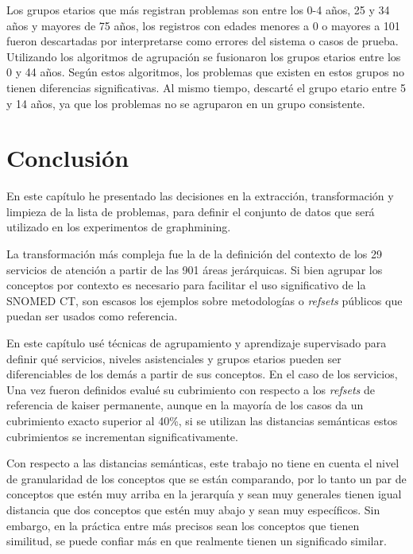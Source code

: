 Los grupos etarios que más registran problemas son entre los 0-4 años, 25 y 34 años y mayores de 75 años, los registros con edades menores a 0 o mayores a 101 fueron descartadas por interpretarse como errores del sistema o casos de prueba. Utilizando los algoritmos de agrupación se fusionaron los grupos etarios entre los 0 y 44 años. Según estos algoritmos, los problemas que existen en estos grupos no tienen diferencias significativas. Al mismo tiempo, descarté el grupo etario entre 5 y 14 años, ya que los problemas no se agruparon en un grupo consistente.

\section{Conclusión}
En este capítulo he presentado las decisiones en la extracción, transformación y limpieza de la lista de problemas, para definir el conjunto de datos que será utilizado en los experimentos de graphmining. 

La transformación más compleja fue la de la definición del contexto de los 29 servicios de atención a partir de las 901 áreas jerárquicas. Si bien agrupar los conceptos por contexto es necesario para facilitar el uso significativo de la SNOMED CT, son escasos los ejemplos sobre metodologías o \textit{refsets} públicos que puedan ser usados como referencia.

En este capítulo usé técnicas de agrupamiento y aprendizaje supervisado para definir qué servicios, niveles asistenciales y grupos etarios pueden ser diferenciables de los demás a partir de sus conceptos. En el caso de los servicios, Una vez fueron definidos evalué su cubrimiento con respecto a los \textit{refsets} de referencia de kaiser permanente, aunque en la mayoría de los casos da un cubrimiento exacto superior al 40\%, si se utilizan las distancias semánticas estos cubrimientos se incrementan significativamente.

Con respecto a las distancias semánticas, este trabajo no tiene en cuenta el nivel de granularidad de los conceptos que se están comparando, por lo tanto un par de conceptos que estén muy arriba en la jerarquía y sean muy generales tienen igual distancia que dos conceptos que estén muy abajo y sean muy específicos. Sin embargo, en la práctica entre más precisos sean los conceptos que tienen similitud, se puede confiar más en que realmente tienen un significado similar.
